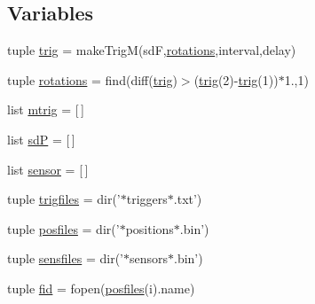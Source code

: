 \subsection*{Variables}
\begin{DoxyCompactItemize}
\item 
tuple \hyperlink{namespacerepo_1_1programs_1_1pythonpackages_1_1pr_1_1getSPdata_af3d30f9077a6d1c700f7f691a8288334}{trig} = make\-Trig\-M(sd\-F,\hyperlink{namespacerepo_1_1programs_1_1pythonpackages_1_1pr_1_1getSPdata_a3cd7917344307847daed23d1f68575c4}{rotations},interval,delay)
\item 
tuple \hyperlink{namespacerepo_1_1programs_1_1pythonpackages_1_1pr_1_1getSPdata_a3cd7917344307847daed23d1f68575c4}{rotations} = find(diff(\hyperlink{namespacerepo_1_1programs_1_1pythonpackages_1_1pr_1_1getSPdata_af3d30f9077a6d1c700f7f691a8288334}{trig})$>$(\hyperlink{namespacerepo_1_1programs_1_1pythonpackages_1_1pr_1_1getSPdata_af3d30f9077a6d1c700f7f691a8288334}{trig}(2)-\/\hyperlink{namespacerepo_1_1programs_1_1pythonpackages_1_1pr_1_1getSPdata_af3d30f9077a6d1c700f7f691a8288334}{trig}(1))$\ast$1.,1)
\item 
list \hyperlink{namespacerepo_1_1programs_1_1pythonpackages_1_1pr_1_1getSPdata_a98628f2f931f1936c89b4f2c90610736}{mtrig} = \mbox{[}$\,$\mbox{]}
\item 
list \hyperlink{namespacerepo_1_1programs_1_1pythonpackages_1_1pr_1_1getSPdata_a1dcdb0bd4cf5fc99ddd642fd2e7dcb7b}{sd\-P} = \mbox{[}$\,$\mbox{]}
\item 
list \hyperlink{namespacerepo_1_1programs_1_1pythonpackages_1_1pr_1_1getSPdata_a5d2dee28b4f96a6448beb4b18e01fb24}{sensor} = \mbox{[}$\,$\mbox{]}
\item 
tuple \hyperlink{namespacerepo_1_1programs_1_1pythonpackages_1_1pr_1_1getSPdata_aa7e1cd1161dfd5e09ecfea09630c0395}{trigfiles} = dir('$\ast$triggers$\ast$.txt')
\item 
tuple \hyperlink{namespacerepo_1_1programs_1_1pythonpackages_1_1pr_1_1getSPdata_ab7bcb6dc1e35e343ea3d5a9f790c1f42}{posfiles} = dir('$\ast$positions$\ast$.bin')
\item 
tuple \hyperlink{namespacerepo_1_1programs_1_1pythonpackages_1_1pr_1_1getSPdata_ad0b93fd48f5d39d35267e0463a7d2e52}{sensfiles} = dir('$\ast$sensors$\ast$.bin')
\item 
tuple \hyperlink{namespacerepo_1_1programs_1_1pythonpackages_1_1pr_1_1getSPdata_a0a88573676ca77c114f061278e10a9e5}{fid} = fopen(\hyperlink{namespacerepo_1_1programs_1_1pythonpackages_1_1pr_1_1getSPdata_ab7bcb6dc1e35e343ea3d5a9f790c1f42}{posfiles}(i).name)

\end{DoxyCompactItemize}
